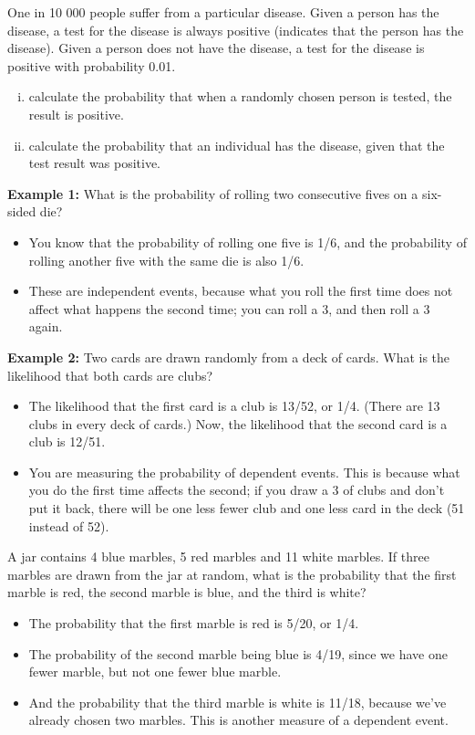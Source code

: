 
\item One in 10 000 people suffer from a particular disease. Given a person has the disease, a test for the disease is always positive (indicates that the person has the disease). Given a person does not have the disease, a test for the disease is positive with probability 0.01.
\begin{enumerate}[(i)]
\item calculate the probability that when a randomly chosen person is tested, the result is positive. 
\item calculate the probability that an individual has the disease, given that the test result was positive.
\end{enumerate}

\item \textbf{Example 1:} What is the probability of rolling two consecutive fives on a six-sided die?
\begin{itemize}
\item You know that the probability of rolling one five is 1/6, and the probability of rolling another five with the same die is also 1/6.
\item These are independent events, because what you roll the first time does not affect what happens the second time; you can roll a 3, and then roll a 3 again.
\end{itemize}

\item \textbf{Example 2:} Two cards are drawn randomly from a deck of cards. What is the likelihood that both cards are clubs?
\begin{itemize}
\item The likelihood that the first card is a club is 13/52, or 1/4. (There are 13 clubs in every deck of cards.) Now, the likelihood that the second card is a club is 12/51.
\item You are measuring the probability of dependent events. This is because what you do the first time affects the second; if you draw a 3 of clubs and don't put it back, there will be one less fewer club and one less card in the deck (51 instead of 52).
\end{itemize}
\item A jar contains 4 blue marbles, 5 red marbles and 11 white marbles. If three marbles are drawn from the jar at random, what is the probability that the first marble is red, the second marble is blue, and the third is white?
\begin{itemize}
\item The probability that the first marble is red is 5/20, or 1/4. 
\item The probability of the second marble being blue is 4/19, since we have one fewer marble, but not one fewer blue marble. 
\item And the probability that the third marble is white is 11/18, because we've already chosen two marbles. This is another measure of a dependent event.
\end{itemize}
